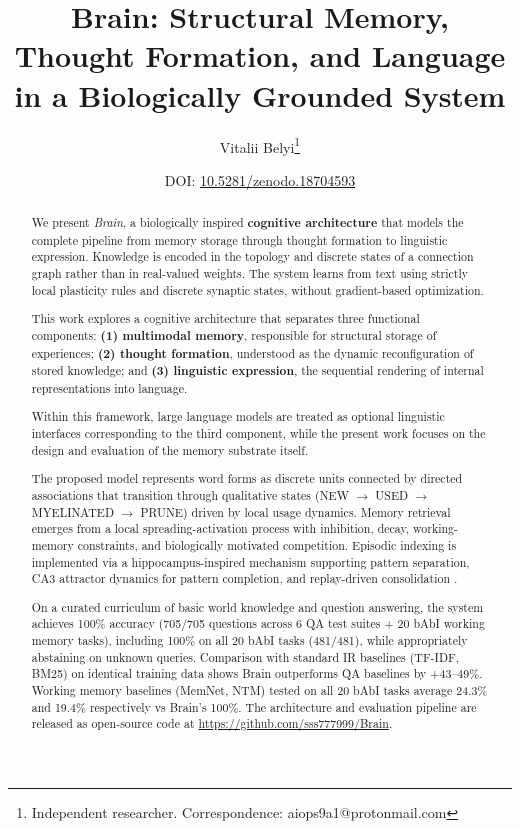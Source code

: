 \documentclass[11pt]{article}
\title{Brain: Structural Memory, Thought Formation, and Language\\
in a Biologically Grounded System}
\author{
  Vitalii Belyi\thanks{Independent researcher. Correspondence: aiops9a1@protonmail.com}
}
\date{
  \vspace{0.5em}
  \normalsize{DOI: \href{https://doi.org/10.5281/zenodo.18704593}{10.5281/zenodo.18704593}}
}
\begin{document}
\maketitle

\begin{abstract}
We present \textit{Brain}, a biologically inspired \textbf{cognitive architecture} that models the complete pipeline from memory storage through thought formation to linguistic expression. Knowledge is encoded in the topology and discrete states of a connection graph rather than in real-valued weights. The system learns from text using strictly local plasticity rules and discrete synaptic states, without gradient-based optimization.

This work explores a cognitive architecture that separates three functional components:
\textbf{(1) multimodal memory}, responsible for structural storage of experiences;
\textbf{(2) thought formation}, understood as the dynamic reconfiguration of stored knowledge;
and \textbf{(3) linguistic expression}, the sequential rendering of internal representations into language.

Within this framework, large language models are treated as optional linguistic interfaces corresponding to the third component, while the present work focuses on the design and evaluation of the memory substrate itself.

The proposed model represents word forms as discrete units connected by directed associations that transition through qualitative states (NEW $\rightarrow$ USED $\rightarrow$ MYELINATED $\rightarrow$ PRUNE) driven by local usage dynamics. Memory retrieval emerges from a local spreading-activation process with inhibition, decay, working-memory constraints, and biologically motivated competition. Episodic indexing is implemented via a hippocampus-inspired mechanism supporting pattern separation, CA3 attractor dynamics for pattern completion, and replay-driven consolidation \citep{teyler1986hippocampal,mcclelland1995there,rolls2013mechanisms}.

On a curated curriculum of basic world knowledge and question answering, the system achieves 100\% accuracy (705/705 questions across 6 QA test suites + 20 bAbI working memory tasks), including 100\% on all 20 bAbI tasks (481/481), while appropriately abstaining on unknown queries. Comparison with standard IR baselines (TF-IDF, BM25) on identical training data shows Brain outperforms QA baselines by +43--49\%. Working memory baselines (MemNet, NTM) tested on all 20 bAbI tasks average 24.3\% and 19.4\% respectively vs Brain's 100\%. The architecture and evaluation pipeline are released as open-source code at \url{https://github.com/sss777999/Brain}.
\end{abstract}
\end{document}
